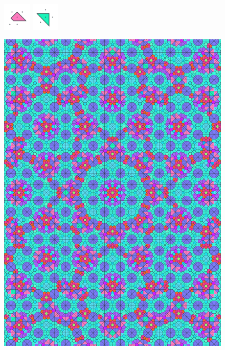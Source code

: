 \documentclass[text.tex]{subfiles}
\begin{document}
\begin{figure}[h!]
\includegraphics[width=0.12\textwidth]{img/results/circle8/circle8_109458_(-1136_471alpha_1)_014.pdf}
\includegraphics[width=0.12\textwidth]{img/results/circle8/circle8_109458_(-1136_471alpha_1)_015.pdf}
\end{figure}

\begin{figure}[h!]
\centering
\includegraphics[width=1\textwidth]{img/results/circle8/quasi_circle_109458_(-1136_471alpha_1).pdf}
\end{figure}
\end{document}
